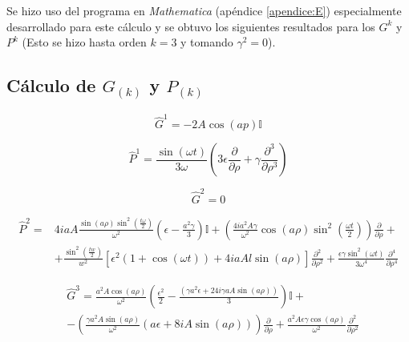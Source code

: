 Se hizo uso del programa en \textit{Mathematica} (ap\'endice \ref{apendice:E}) especialmente desarrollado para este cálculo y se obtuvo los siguientes resultados para los $G^k$ y $P^k$ (Esto se hizo hasta orden $k=3$ y tomando $\gamma^2=0$).

\subsection{Cálculo de $G_{(k)}$ y $P_{(k)}$}

\begin{equation}\label{eq:10.31}
    \hat{G}^{1}=-2 A \cos(a p)\mathbb{I}
\end{equation}

\begin{equation}\label{eq:10.32}
    \hat{P}^{1}=\frac{\sin(\omega t)}{3 \omega} \left(3 \epsilon \frac{\partial}{\partial \rho}+\gamma \frac{\partial^3}{\partial \rho^3}\right)
\end{equation}

\begin{equation}\label{eq:10.33}
    \hat{G}^{2}=0
\end{equation}

\begin{equation}\label{eq:10.34}
\begin{split}
     \hat{P}^{2}=&4iaA\frac{\sin (a \rho) \sin ^2\left(\frac{t \omega}{2}\right)}{\omega^2}\left( \epsilon-\frac{
    a^2 \gamma }{3}\right)\mathbb{I}+\left(\frac{4 i a^2 A \gamma }{\omega^2}\cos (a \rho) \sin ^2\left(\frac{\omega t}{2}\right)\right)\frac{\partial}{\partial \rho}+\\
    &+\frac{\sin ^2\left(\frac{t w}{2}\right)}{w^2}\left[\epsilon^2\left(1 +\cos (\omega t)\right)+4 i a A l \sin (a \rho) \right]\frac{\partial^2}{\partial \rho^2}+\frac{\epsilon \gamma \sin ^2(\omega t)}{3 \omega^4}\frac{\partial^4}{\partial \rho^4}
 \end{split}
\end{equation}

\begin{equation}\label{eq:10.35}
\begin{split}
    &\hat{G}^{3}=\frac{a^2 A\cos (a \rho)}{\omega^2}\left(\frac{ \epsilon^2 }{2}-\frac{\left(\gamma a^2
   \epsilon+24 i\gamma aA \sin (a \rho)\right)}{3 }\right)\mathbb{I}+\\&
   -\left(\frac{\gamma a^2A \sin (a \rho)}{\omega^2}\left(a \epsilon+8 i A \sin (a \rho)\right)\right)\frac{\partial}{\partial \rho}+\frac{a^2 A \epsilon \gamma \cos (a \rho)}{\omega^2}\frac{\partial^2}{\partial \rho^2}
\end{split}
\end{equation}

